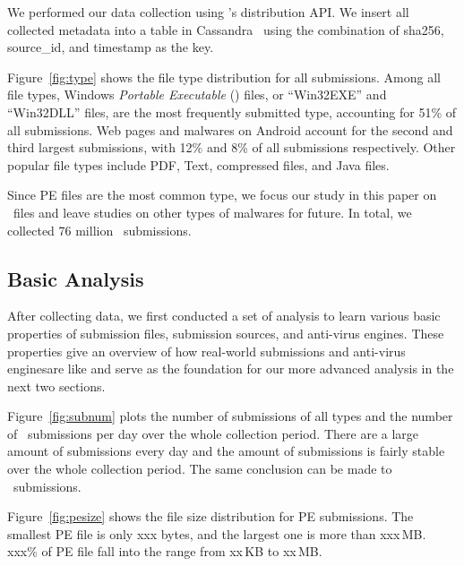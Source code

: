 We performed our data collection using \vt{}’s distribution API.
We insert all collected metadata into a table in Cassandra~\cite{cassandra} 
using the combination of sha256, source\_id, and timestamp as the key.



Figure~\ref{fig:type} shows the file type distribution for all submissions. 
Among all file types, Windows \textit{Portable Executable} ({\em \pe}) files, or ``Win32EXE'' and ``Win32DLL'' files, 
are the most frequently submitted type,
accounting for 51\% of all submissions.
Web pages and malwares on Android account for the second and third largest submissions, 
with 12\% and 8\% of all submissions respectively. 
Other popular file types include PDF, Text, compressed files, and Java files. 

Since PE files are the most common type,
we focus our study in this paper on \pe\ files 
and leave studies on other types of malwares for future. 
In total, we collected 76 million \pe\ submissions.

\subsection{Basic Analysis}
After collecting data, we first conducted a set of analysis 
to learn various basic properties of submission files, 
submission sources, and anti-virus engines.
These properties give an overview of how real-world submissions and anti-virus enginesare like
and serve as the foundation for our more advanced analysis in the next two sections. 



Figure~\ref{fig:subnum} plots the number of submissions of all types and the number of \pe\ submissions per day 
over the whole collection period.
There are a large amount of submissions every day
and the amount of submissions is fairly stable over the whole collection period.
The same conclusion can be made to \pe\ submissions.


Figure~\ref{fig:pesize} shows the file size distribution for PE submissions. 
The smallest PE file is only xxx bytes, and the largest one is more than xxx\,MB. 
xxx\% of PE file fall into the range from xx\,KB to xx\,MB. 


